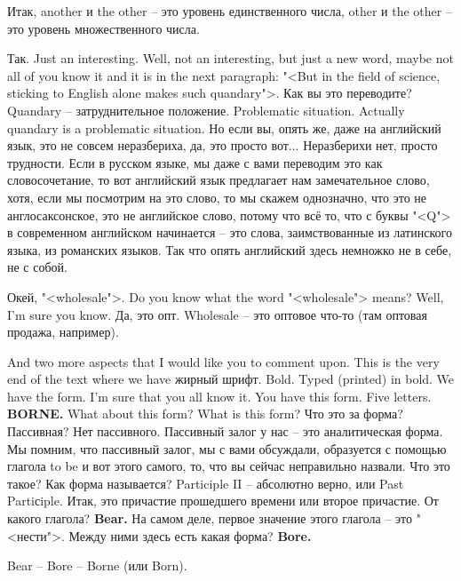 \documentclass[main.tex]{subfiles}
\begin{document}
Итак, another и the other -- это уровень единственного числа, other и the other -- это уровень множественного числа.

Так.
Just an interesting.
Well, not an interesting, but just a new word, maybe not all of you know it and it is in the next paragraph: "<But in the field of science, sticking to English alone makes such quandary">.
Как вы это переводите?
Quandary -- затруднительное положение.
Problematic situation.
Actually quandary is a problematic situation.
Но если вы, опять же, даже на английский язык, это не совсем неразбериха, да, это просто вот...
Неразберихи нет, просто трудности.
Если в русском языке, мы даже с вами переводим это как словосочетание, то вот английский язык предлагает нам замечательное слово, хотя, если мы посмотрим на это слово, то мы скажем однозначно, что это не англосаксонское, это не английское слово, потому что всё то, что с буквы "<Q"> в современном английском начинается -- это слова, заимствованные из латинского языка, из романских языков.
Так что опять английский здесь немножко не в себе, не с собой.

Окей, "<wholesale">.
Do you know what the word "<wholesale"> means?
Well, I'm sure you know.
Да, это опт.
Wholesale -- это оптовое что-то (там оптовая продажа, например).

And two more aspects that I would like you to comment upon.
This is the very end of the text where we have жирный шрифт.
Bold.
Typed (printed) in bold.
We have the form.
I'm sure that you all know it.
You have this form.
Five letters.
\textbf{BORNE.}
What about this form?
What is this form?
Что это за форма?
Пассивная?
Нет пассивного.
Пассивный залог у нас -- это аналитическая форма.
Мы помним, что пассивный залог, мы с вами обсуждали, образуется с помощью глагола to be и вот этого самого, то, что вы сейчас неправильно назвали.
Что это такое?
Как форма называется?
Participle II -- абсолютно верно, или Past Partiсiple.
Итак, это причастие прошедшего времени или второе причастие.
От какого глагола?
\textbf{Bear.}
На самом деле, первое значение этого глагола – это "<нести">.
Между ними здесь есть какая форма?
\textbf{Bore.}

Bear -- Bore -- Borne (или Born).
\end{document}
